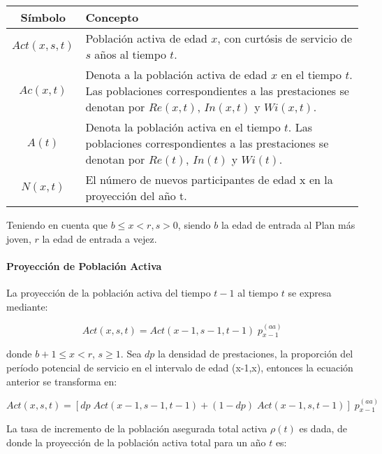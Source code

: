 \documentclass[12pt,letterpaper,titlepage]{article}
\begin{document}
{\begin{center}
	\begin{tabular}{|c||p{11cm}|}
	\hline 
	\rule[-1ex]{0pt}{2.5ex} Símbolo & Concepto \\ 
	\hline 
	\hline 
	\rule[-1ex]{0pt}{2.5ex} $Act(x,s,t)$ & Población activa de edad $x$, con curtósis de servicio de $s$ años al tiempo $t$. \\ 
	\hline 
	\rule[-1ex]{0pt}{2.5ex} $Ac(x,t)$ & Denota a la población activa de edad $x$ en el tiempo $t$. Las poblaciones correspondientes a las prestaciones  se denotan por $Re(x,t)$, $In(x,t)$ y $Wi(x,t)$. \\ 
	\hline 
	\rule[-1ex]{0pt}{2.5ex} $A(t)$ & Denota la población activa en el tiempo $t$. Las poblaciones correspondientes a las prestaciones se denotan por $Re(t)$, $In(t)$ y $Wi(t)$.  \\ 
	\hline 
	\rule[-1ex]{0pt}{2.5ex} $N(x,t)$ & El número de nuevos participantes de edad x en la proyección del año t. \\ 
	\hline 
\end{tabular} 
\end{center}
Teniendo en cuenta que $b\leqslant x<r, s>0$, siendo $b$ la edad de entrada al Plan más joven, $r$ la edad de entrada a vejez.

\paragraph{Proyección de Población Activa}

La proyección de la población activa del tiempo $t-1$ al tiempo $t$ se expresa mediante:

\[ Act(x,s,t)=Act(x-1,s-1,t-1)\;p^{(aa)}_{x-1} \]

donde $b+1\leq x<r$, $s\geq1$. Sea $dp$ la densidad de prestaciones, la proporción del período potencial de servicio en el intervalo de edad (x-1,x), entonces la ecuación anterior se transforma en:

\[Act(x,s,t)=[dp\;Act(x-1,s-1,t-1)+(1-dp)\;Act(x-1,s,t-1)]\;p_{x-1}^{(aa)}\]

La tasa de incremento de la población asegurada total activa $\rho(t)$ es dada, de donde la proyección de la población activa total para un año $t$ es:

}
\end{document}
